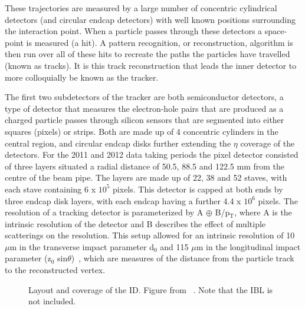 These trajectories are measured by a large number of concentric cylindrical detectors (and circular endcap detectors)  with well known positions surrounding the interaction point.  
When a particle passes through these detectors a space-point is measured (a hit).  
A pattern recognition, or reconstruction, algorithm is then run over all of these hits to recreate the paths the particles have travelled (known as tracks).  
It is this track reconstruction that leads the inner detector to more colloquially be known as the tracker.  

The first two subdetectors of the tracker are both semiconductor detectors, a type of detector that measures the electron-hole pairs that are produced as a charged particle passes through silicon sensors that are segmented into either squares (pixels) or strips.  
Both are made up of 4 concentric cylinders in the central region, and circular endcap disks further extending the $\eta$ coverage of the detectors.  
For the 2011 and 2012 data taking periods the pixel detector consisted of three layers situated a radial distance of 50.5, 88.5 and 122.5 mm from the centre of the beam pipe.  
The layers are made up of 22, 38 and 52 staves, with each stave containing 6 x $10^5$ pixels.  
This detector is capped at both ends by three endcap disk layers, with each endcap having a further 4.4 x $10^6$ pixels.  
The resolution of a tracking detector is parameterized by A $\oplus$ B/p$_{\mathrm{T}}$, where A is the intrinsic resolution of the detector and B describes the effect of multiple scatterings on the resolution.  
This setup allowed for an intrinsic resolution of 10 $\mu$m in the transverse impact parameter d$_{0}$ and 115 $\mu$m in the longitudinal impact parameter (z$_{0}$ sin$\theta$)~\cite{ID3}, which are measures of the distance from the particle track to the reconstructed vertex. 

\begin{figure}[!ht]
 \begin{center}
 \end{center}
 \caption[Layout and coverage of the ID]
 {\small Layout and coverage of the ID.  Figure from ~\cite{Iwamoto:2013kla}.  Note that the IBL is not included.}
 \label{IDCoverage}
\end{figure} 

